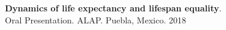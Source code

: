 \documentclass[12pt]{article}
\begin{document}
\textbf{Dynamics of life expectancy and lifespan equality}.\\ Oral Presentation. ALAP. Puebla, Mexico. \hfill { 2018}\\




%
%
% 
%
%
%  


\end{document}
